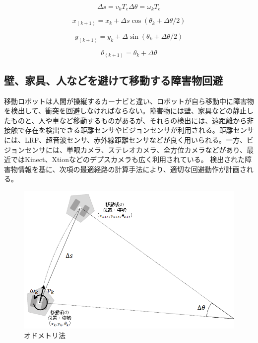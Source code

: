 \begin{equation}
\Delta s=v_k T_e
\Delta\theta=\omega_k T_e
\end{equation}

\begin{equation}
x_(k+1)=x_k+\Delta s \cos(\theta_k+\Delta\theta/2)
\end{equation}

\begin{equation}
y_(k+1)=y_k+\Delta \sin(\theta_k+\Delta\theta/2)
\end{equation}

\begin{equation}
\theta_(k+1)=\theta_k+\Delta\theta
\end{equation}

\subsection{壁、家具、人などを避けて移動する障害物回避}

移動ロボットは人間が操縦するカーナビと違い、ロボットが自ら移動中に障害物を検出して、衝突を回避しなければならない。障害物には壁、家具などの静止したものと、人や車など移動するものがあるが、それらの検出には、遠距離から非接触で存在を検出できる距離センサやビジョンセンサが利用される。距離センサには、LRF、超音波センサ、赤外線距離センサなどが良く用いられる。一方、ビジョンセンサには、単眼カメラ、ステレオカメラ、全方位カメラなどがあり、最近ではKinect、Xtionなどのデプスカメラも広く利用されている。  検出された障害物情報を基に、次項の最適経路の計算手法により、適切な回避動作が計画される。

\begin{figure}[htp]
  \centering
  \includegraphics[width=12cm]{pictures/chapter10/pic_10_03.png}
  \caption{オドメトリ法}
\end{figure}


